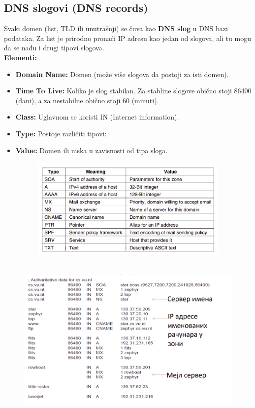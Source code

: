 \documentclass[a4paper]{article}
\begin{document}
    \subsection{DNS slogovi (DNS records)}
        Svaki domen (list, TLD ili unutrašnji) se čuva kao \textbf{DNS slog} u DNS bazi podataka. 
        Za list je prirodno pronaći IP adresu kao jedan od slogova, ali
        tu mogu da se nađu i drugi tipovi slogova. \\
        \noindent \textbf{Elementi:}
        \begin{itemize}
            \item \textbf{Domain Name:} Domen (može više slogova da postoji za isti domen).
            \item \textbf{Time To Live:} Koliko je slog stabilan. Za stabline slogove obično
                  stoji 86400 (dani), a za nestabilne obično stoji 60 (minuti).
            \item \textbf{Class:} Uglavnom se koristi IN (Internet information).  
            \item \textbf{Type:} Postoje različiti tipovi:
            \item \textbf{Value:} Domen ili niska u zavisnosti od tipa sloga.
        \end{itemize}
        \begin{figure}[H]
            \begin{center}
                \includegraphics[width=120mm,height=50mm]{Slike/dns2.png}
            \end{center}
        \end{figure}
        \begin{figure}[H]
            \begin{center}
                \includegraphics[width=120mm,height=80mm]{Slike/dns3.png}
            \end{center}
        \end{figure}
\end{document}
